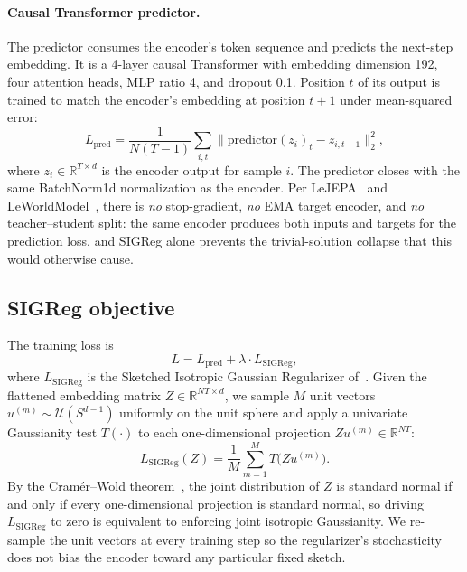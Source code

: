 \paragraph{Causal Transformer predictor.}
The predictor consumes the encoder's token sequence and predicts the
next-step embedding. It is a 4-layer causal Transformer with embedding
dimension 192, four attention heads, MLP ratio 4, and dropout 0.1. Position
$t$ of its output is trained to match the encoder's embedding at position
$t{+}1$ under mean-squared error:
\begin{equation}
  L_\text{pred} = \frac{1}{N(T-1)}\sum_{i,t}
    \|\text{predictor}(z_i)_t - z_{i,t+1}\|_2^2,
  \label{eq:lpred}
\end{equation}
where $z_i \in \mathbb{R}^{T \times d}$ is the encoder output for sample $i$.
The predictor closes with the same BatchNorm1d normalization as the encoder.
Per LeJEPA~\cite{lejepa2025} and LeWorldModel~\cite{lewm2026}, there is
\emph{no} stop-gradient, \emph{no} EMA target encoder, and \emph{no}
teacher--student split: the same encoder produces both inputs and targets
for the prediction loss, and SIGReg alone prevents the trivial-solution
collapse that this would otherwise cause.

\subsection{SIGReg objective}
\label{sec:method:sigreg}

The training loss is
\begin{equation}
  L = L_\text{pred} + \lambda \cdot L_\text{SIGReg},
  \label{eq:ltotal}
\end{equation}
where $L_\text{SIGReg}$ is the Sketched Isotropic Gaussian Regularizer
of~\cite{lejepa2025}. Given the flattened embedding matrix
$Z \in \mathbb{R}^{NT \times d}$, we sample $M$ unit vectors
$u^{(m)} \sim \mathcal{U}(S^{d-1})$ uniformly on the unit sphere and apply a
univariate Gaussianity test $T(\cdot)$ to each one-dimensional projection
$Z u^{(m)} \in \mathbb{R}^{NT}$:
\begin{equation}
  L_\text{SIGReg}(Z) = \frac{1}{M}\sum_{m=1}^{M} T\bigl(Z u^{(m)}\bigr).
  \label{eq:sigreg}
\end{equation}
By the Cram\'er--Wold theorem~\cite{cramerwold1936}, the joint distribution
of $Z$ is standard normal if and only if every one-dimensional projection
is standard normal, so driving $L_\text{SIGReg}$ to zero is equivalent to
enforcing joint isotropic Gaussianity. We re-sample the unit vectors at
every training step so the regularizer's stochasticity does not bias the
encoder toward any particular fixed sketch.

